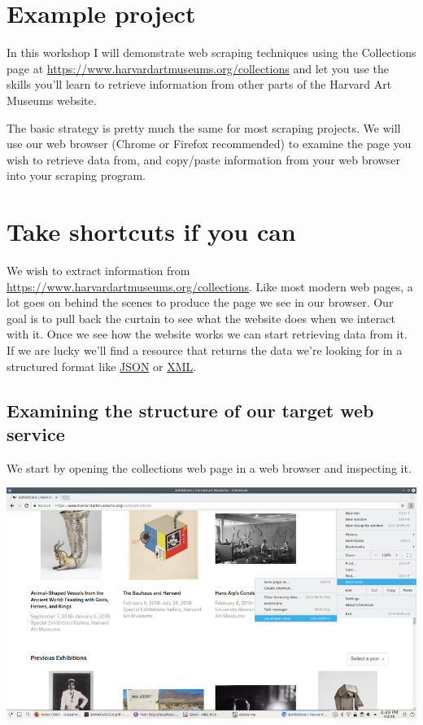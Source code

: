 \documentclass[]{book}
\begin{document}
\hypertarget{example-project}{%
\section{Example project}\label{example-project}}

In this workshop I will demonstrate web scraping techniques using the
Collections page at
\url{https://www.harvardartmuseums.org/collections} and let you use
the skills you'll learn to retrieve information from other parts of
the Harvard Art Museums website.

The basic strategy is pretty much the same for most scraping projects.
We will use our web browser (Chrome or Firefox recommended) to examine
the page you wish to retrieve data from, and copy/paste information
from your web browser into your scraping program.

\hypertarget{take-shortcuts-if-you-can}{%
\section{Take shortcuts if you can}\label{take-shortcuts-if-you-can}}

We wish to extract information from
\url{https://www.harvardartmuseums.org/collections}. Like most
modern web pages, a lot goes on behind the scenes to produce the page
we see in our browser. Our goal is to pull back the curtain to see
what the website does when we interact with it. Once we see how the
website works we can start retrieving data from it. If we are lucky
we'll find a resource that returns the data we're looking for in a
structured format like \href{https://json.org/}{JSON} or
\href{https://en.wikipedia.org/wiki/XML}{XML}.

\hypertarget{examining-the-structure-of-our-target-web-service}{%
\subsection{Examining the structure of our target web service}\label{examining-the-structure-of-our-target-web-service}}

We start by opening the collections web page in a web browser and
inspecting it.

\includegraphics{Python/PythonWebScrape/images/dev_tools.png}
\end{document}
